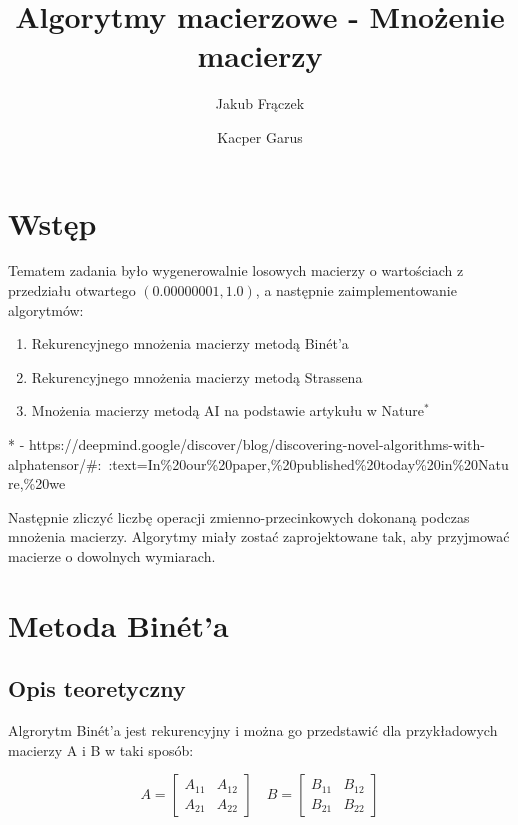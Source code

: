 \documentclass{article}
\title{Algorytmy macierzowe - Mnożenie macierzy}
\author{Jakub Frączek \and Kacper Garus}
\begin{document}
\sloppy

\maketitle

\tableofcontents

\newpage

\section{Wstęp}

Tematem zadania było wygenerowalnie losowych macierzy o wartościach z przedziału otwartego \((0.00000001, 1.0)\), a następnie zaimplementowanie algorytmów:

\begin{enumerate}
    \item Rekurencyjnego mnożenia macierzy metodą Binét’a
    \item Rekurencyjnego mnożenia macierzy metodą Strassena
    \item Mnożenia macierzy metodą AI na podstawie artykułu w Nature\(^*\)
\end{enumerate}

\noindent
* - https://deepmind.google/discover/blog/discovering-novel-algorithms-with-alphatensor/\#:~:text=In\%20our\%20paper,\%20published\%20today\%20in\%20Nature,\%20we

\bigbreak
\noindent
Następnie zliczyć liczbę operacji zmienno-przecinkowych dokonaną podczas mnożenia macierzy. Algorytmy miały zostać zaprojektowane tak, aby przyjmować macierze o dowolnych wymiarach.

\section{Metoda Binét’a}

\subsection{Opis teoretyczny}

Algrorytm Binét'a jest rekurencyjny i można go przedstawić dla przykładowych macierzy A i B w taki sposób:

\[
A =
\begin{bmatrix}
A_{11} & A_{12} \\
A_{21} & A_{22}
\end{bmatrix}
\quad
B =
\begin{bmatrix}
B_{11} & B_{12} \\
B_{21} & B_{22}
\end{bmatrix}
\]
\end{document}

